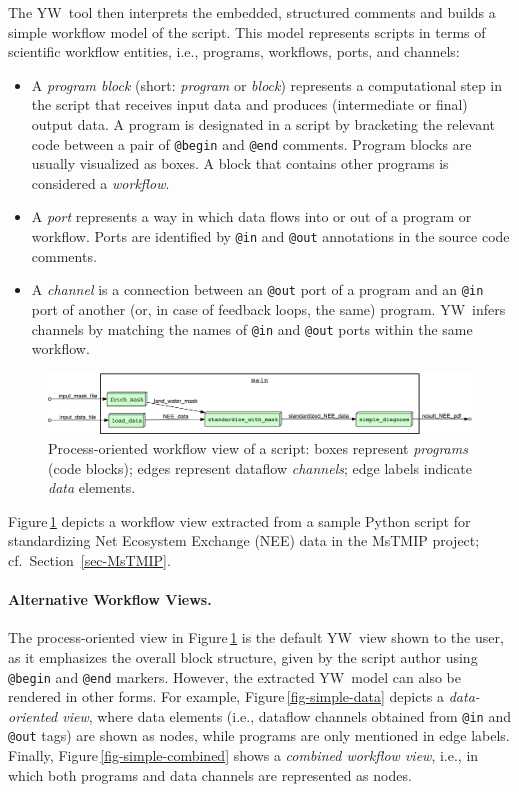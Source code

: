 \documentclass{article}
\newcommand{\yw}{\textsf{YW}}
\newcommand{\ywa}[1]{\texttt{#1}}
\newcommand{\figref}[1]{Figure\,\ref{#1}}
\begin{document}
The \yw\ tool then interprets the embedded, structured comments and
builds a simple workflow model of the script. This model represents
scripts in terms of scientific workflow entities, i.e., programs,
workflows, ports, and channels:

\begin{itemize}
\item A \emph{program block} (short: \emph{program} or \emph{block})
  represents a computational step in the script that receives input
  data and produces (intermediate or final) output data. A program is
  designated in a script by bracketing the relevant code between a
  pair of \ywa{@begin} and \ywa{@end} comments. Program blocks are
  usually visualized as boxes. A block that contains other programs is
  considered a \emph{workflow}. \item A \emph{port} represents a way
  in which data flows into or out of a program or workflow. Ports are
  identified by \ywa{@in} and \ywa{@out} annotations in the source
  code comments.
\item A \emph{channel} is a connection between an \ywa{@out} port
of a program and an \ywa{@in} port of another (or, in case of feedback
loops, the same) program. \yw\ infers
channels by matching the names of \ywa{@in} and \ywa{@out} 
ports within the same workflow.
\end{itemize}

 \begin{figure}[t]
   \centering
   \includegraphics[width=1.0\textwidth]{example_process-crop.pdf}
   \caption{Process-oriented workflow view of a script: boxes
     represent \emph{programs} (code blocks); edges represent dataflow
     \emph{channels}; edge labels indicate \emph{data}
     elements.}
   \label{fig-simple-process}
 \end{figure}

 \noindent \figref{fig-simple-process} depicts a workflow view
 extracted from a sample Python script for standardizing Net Ecosystem
 Exchange (NEE) data in the MsTMIP project; cf.~Section~\ref{sec-MsTMIP}.

\paragraph{Alternative Workflow Views.}
The process-oriented view in \figref{fig-simple-process} is the
default \yw\ view shown to the user, as it emphasizes the overall
block structure, given by the script author using \ywa{@begin} and
\ywa{@end} markers.  However, the extracted \yw\ model can also be
rendered in other forms.  For example, \figref{fig-simple-data}
depicts a \emph{data-oriented view}, where data elements (i.e.,
dataflow channels obtained from \ywa{@in} and \ywa{@out} tags) are
shown as nodes, while programs are only mentioned in edge labels.
Finally, \figref{fig-simple-combined} shows a \emph{combined workflow
  view}, i.e., in which both programs and data channels are
represented as nodes.
\end{document}
